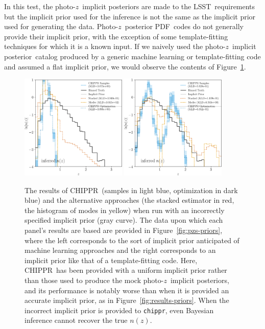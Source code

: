 \documentclass[iop]{emulateapj}
\newcommand{\todo}[3]{{\color{#2}\emph{#1}: #3}}
\newcommand{\aim}[1]{\todo{AIM}{red}{#1}}
\newcommand{\Fig}[1]{Figure~\ref{#1}}
\newcommand{\project}[1]{\textsc{#1}}
\newcommand{\lsst}{\project{LSST}}
\newcommand{\Chippr}{\project{CHIPPR}}%
\newcommand{\repo}[1]{\texttt{#1}}
\newcommand{\chippr}{\repo{chippr}}
\newcommand{\pz}{photo-$z$}
\newcommand{\Pz}{Photo-$z$}
\newcommand{\Pzpdf}{\Pz\ posterior PDF}%
\newcommand{\pzip}{\pz\ implicit posterior}
\newcommand{\nz}{$n(z)$}
\begin{document}
In this test, the \pzip s are made to the \lsst\ requirements but the implicit prior used for the inference is not the same as the implicit prior used for generating the data.
\Pzpdf\ codes do not generally provide their implicit prior, with the exception of some template-fitting techniques for which it is a known input.
If we naively used the \pzip\ catalog produced by a generic machine learning or template-fitting code and assumed a flat implicit prior, we would observe the contents of \Fig{fig:mischaracterized}.

\begin{figure}
	\begin{center}
		\includegraphics[width=0.45\textwidth]{figures/chippr/single_lsst_trpr_wrong_log_estimators.png}
		\includegraphics[width=0.45\textwidth]{figures/chippr/single_lsst_tmpr_wrong_log_estimators.png}
		\caption
		{The results of \Chippr\ (samples in light blue, optimization in dark blue) and the alternative approaches (the stacked estimator in red, the histogram of modes in yellow) when run with an incorrectly specified implicit prior (gray curve).
			The data upon which each panel's results are based are provided in Figure~\ref{fig:pzs-priors}, where the left corresponds to the sort of implicit prior anticipated of machine learning approaches and the right corresponds to an implicit prior like that of a template-fitting code.
			Here, \Chippr\ has been provided with a uniform implicit prior rather than those used to produce the mock \pzip s, and its performance is notably worse than when it is provided an accurate implicit prior, as in Figure~\ref{fig:results-priors}.
			When the incorrect implicit prior is provided to \chippr, even Bayesian inference cannot recover the true \nz.
		}
		\label{fig:mischaracterized}
	\end{center}
\end{figure}
\end{document}
